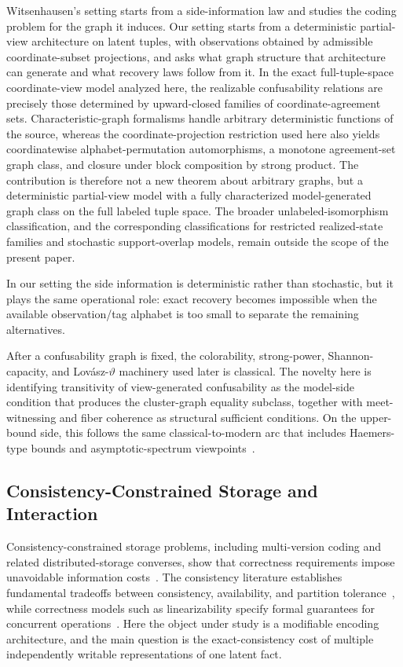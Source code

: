 Witsenhausen's setting starts from a side-information law and studies the coding problem for the graph it induces. Our setting starts from a deterministic partial-view architecture on latent tuples, with observations obtained by admissible coordinate-subset projections, and asks what graph structure that architecture can generate and what recovery laws follow from it. In the exact full-tuple-space coordinate-view model analyzed here, the realizable confusability relations are precisely those determined by upward-closed families of coordinate-agreement sets. Characteristic-graph formalisms handle arbitrary deterministic functions of the source, whereas the coordinate-projection restriction used here also yields coordinatewise alphabet-permutation automorphisms, a monotone agreement-set graph class, and closure under block composition by strong product. The contribution is therefore not a new theorem about arbitrary graphs, but a deterministic partial-view model with a fully characterized model-generated graph class on the full labeled tuple space. The broader unlabeled-isomorphism classification, and the corresponding classifications for restricted realized-state families and stochastic support-overlap models, remain outside the scope of the present paper.

In our setting the side information is deterministic rather than stochastic, but it plays the same operational role: exact recovery becomes impossible when the available observation/tag alphabet is too small to separate the remaining alternatives.

After a confusability graph is fixed, the colorability, strong-power, Shannon-capacity, and Lov\'asz-$\vartheta$ machinery used later is classical. The novelty here is identifying transitivity of view-generated confusability as the model-side condition that produces the cluster-graph equality subclass, together with meet-witnessing and fiber coherence as structural sufficient conditions. On the upper-bound side, this follows the same classical-to-modern arc that includes Haemers-type bounds and asymptotic-spectrum viewpoints~\cite{haemers1978upper,zuiddam2019asymptotic,deboer2024asymptotic}.

\subsection{Consistency-Constrained Storage and Interaction}\label{sec:related-distributed}

Consistency-constrained storage problems, including multi-version coding and related distributed-storage converses, show that correctness requirements impose unavoidable information costs~\cite{rashmi2015multiversion}. The consistency literature establishes fundamental tradeoffs between consistency, availability, and partition tolerance~\cite{brewer2000cap,gilbert2002cap,gray1978notes}, while correctness models such as linearizability specify formal guarantees for concurrent operations~\cite{herlihy1990linearizability}. Here the object under study is a modifiable encoding architecture, and the main question is the exact-consistency cost of multiple independently writable representations of one latent fact.


